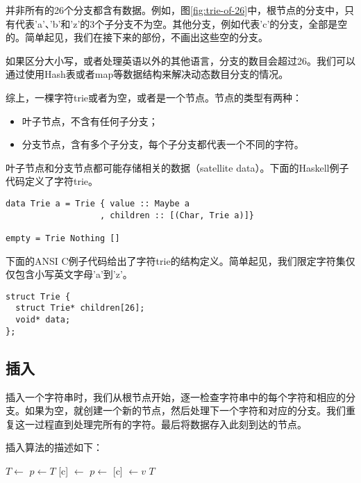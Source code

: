\documentclass[UTF8]{article}
\begin{document}
并非所有的26个分支都含有数据。例如，图\ref{fig:trie-of-26}中，根节点的分支中，只有代表'a'、'b'和'z'的3个子分支不为空。其他分支，例如代表'c'的分支，全部是空的。简单起见，我们在接下来的部份，不画出这些空的分支。

如果区分大小写，或者处理英语以外的其他语言，分支的数目会超过26。我们可以通过使用Hash表或者map等数据结构来解决动态数目分支的情况。

综上，一棵字符trie或者为空，或者是一个节点。节点的类型有两种：

\begin{itemize}
\item 叶子节点，不含有任何子分支；
\item 分支节点，含有多个子分支，每个子分支都代表一个不同的字符。
\end{itemize}

叶子节点和分支节点都可能存储相关的数据（satellite data）。下面的Haskell例子代码定义了字符trie。

\lstset{language=Haskell}
\begin{lstlisting}
data Trie a = Trie { value :: Maybe a
                   , children :: [(Char, Trie a)]}

empty = Trie Nothing []
\end{lstlisting}

下面的ANSI C例子代码给出了字符trie的结构定义。简单起见，我们限定字符集仅仅包含小写英文字母'a'到'z'。

\lstset{language=C}
\begin{lstlisting}
struct Trie {
  struct Trie* children[26];
  void* data;
};
\end{lstlisting}


\subsection{插入}

插入一个字符串时，我们从根节点开始，逐一检查字符串中的每个字符和相应的分支。如果为空，就创建一个新的节点，然后处理下一个字符和对应的分支。我们重复这一过程直到处理完所有的字符。最后将数据存入此刻到达的节点。

插入算法的描述如下：

\begin{algorithmic}[1]
    \State $T \gets $ 
  \EndIf
  \State $p \gets T$
      \State {}[c] $\gets$ 
    \EndIf
    \State $p \gets $ [c]
  \EndFor
  \State {} $\gets v$
  \State \Return $T$
\EndFunction
\end{algorithmic}
\end{document}
